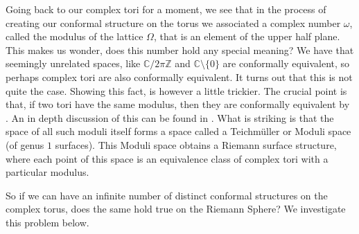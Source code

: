 \documentclass[11pt]{report}
\theoremstyle{definition}
\begin{document}
Going back to our complex tori for a moment, we see that in the process of creating our conformal structure on the torus we associated a complex number $\omega$, called the modulus of the lattice $\Omega$, that is an element of the upper half plane. This makes us wonder, does this number hold any special meaning? We have that seemingly unrelated spaces, like $\mathbb{C}/2\pi \mathbb{Z}$ and $\mathbb{C}\setminus \{0\}$ are conformally equivalent, so perhaps complex tori are also conformally equivalent. It turns out that this is not quite the case. Showing this fact, is however a little trickier.  The crucial point is that, if two tori have the same modulus, then they are conformally equivalent by \cite[Theorem 6.1.4]{comfun}. An in depth discussion of this can be found in \cite[Section 6.1]{comfun}. What is striking is that the space of all such moduli itself forms a space called a Teichm\"{u}ller or Moduli space (of genus $1$ surfaces). This Moduli space obtains a Riemann surface structure, where each point of this space is an equivalence class of complex tori with a particular modulus.

So if we can have an infinite number of distinct conformal structures on the complex torus, does the same hold true on the Riemann Sphere? We investigate this problem below.
\end{document}
